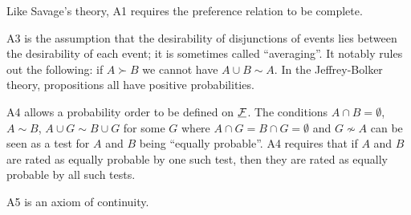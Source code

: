 Like Savage's theory, A1 requires the preference relation to be complete.

A3 is the assumption that the desirability of disjunctions of events lies between the desirability of each event; it is sometimes called ``averaging''. It notably rules out the following: if $A\succ B$ we cannot have $A\cup B\sim A$. In the Jeffrey-Bolker theory, propositions all have positive probabilities.

A4 allows a probability order to be defined on $\underline{\mathcal{F}}$. The conditions $A\cap B=\emptyset$, $A\sim B$, $A\cup G\sim B\cup G$ for some $G$ where $A\cap G=B\cap G=\emptyset$ and $G\not\sim A$ can be seen as a test for $A$ and $B$ being ``equally probable''. A4 requires that if $A$ and $B$ are rated as equally probable by one such test, then they are rated as equally probable by all such tests.

A5 is an axiom of continuity.